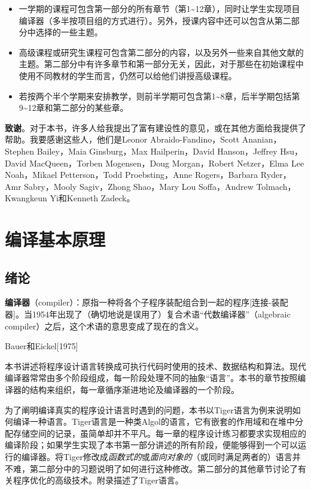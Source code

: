 \documentclass[cn,11pt,chinese]{elegantbook}
\begin{document}
\begin{itemize}
  \item 一学期的课程可包含第一部分的所有章节（第1\textasciitilde 12章），同时让学生实现项目编译器（多半按项目组的方式进行）。另外，授课内容中还可以包含从第二部分中选择的一些主题。
  \item 高级课程或研究生课程可包含第二部分的内容，以及另外一些来自其他文献的主题。第二部分中有许多章节和第一部分无关，因此，对于那些在初始课程中使用不同教材的学生而言，仍然可以给他们讲授高级课程。
  \item 若按两个半个学期来安排教学，则前半学期可包含第1\textasciitilde 8章，后半学期包括第9\textasciitilde 12章和第二部分的某些章。
\end{itemize}

\textbf{致谢}。对于本书，许多人给我提出了富有建设性的意见，或在其他方面给我提供了帮助。我要感谢这些人，他们是Leonor Abraido-Fandino，Scott Ananian，Stephen Bailey，Maia Ginsburg，Max Hailperin，David Hanson，Jeffrey Hsu，David MacQueen，Torben Mogensen，Doug Morgan，Robert Netzer，Elma Lee Noah，Mikael Petterson，Todd Proebsting，Anne Rogers，Barbara Ryder，Amr Sabry，Mooly Sagiv，Zhong Shao，Mary Lou Soffa，Andrew Tolmach，Kwangkeun Yi和Kenneth Zadeck。

\part{编译基本原理}

\chapter{绪论}

\epigraph{\textbf{编译器}（compiler）：原指一种将各个子程序装配组合到一起的程序[连接-装配器]。当1954年出现了（确切地说是误用了）复合术语“代数编译器”（algebraic compiler）之后，这个术语的意思变成了现在的含义。}{Bauer和Eickel[1975]}

本书讲述将程序设计语言转换成可执行代码时使用的技术、数据结构和算法。现代编译器常常由多个阶段组成，每一阶段处理不同的抽象“语言”。本书的章节按照编译器的结构来组织，每一章循序渐进地论及编译器的一个阶段。

为了阐明编译真实的程序设计语言时遇到的问题，本书以Tiger语言为例来说明如何编译一种语言。Tiger语言是一种类Algol的语言，它有嵌套的作用域和在堆中分配存储空间的记录，虽简单却并不平凡。每一章的程序设计练习都要求实现相应的编译阶段；如果学生实现了本书第一部分讲述的所有阶段，便能够得到一个可以运行的编译器。将Tiger修改成\textit{函数式的}或\textit{面向对象的}（或同时满足两者的）语言并不难，第二部分中的习题说明了如何进行这种修改。第二部分的其他章节讨论了有关程序优化的高级技术。附录描述了Tiger语言。
\end{document}
